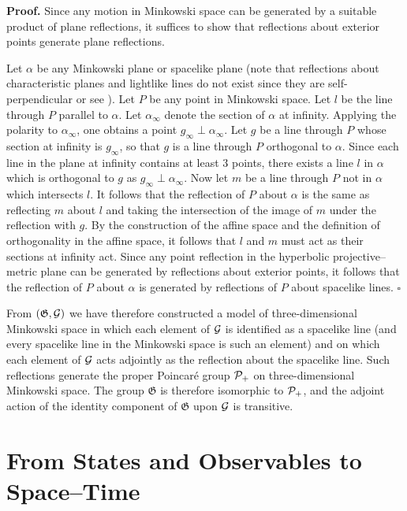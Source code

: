 \documentclass[a4paper,twoside,12pt]{article}
\newenvironment{proof}{\medskip \noindent 
            {\bf Proof.}}{ \hfill $\square$ \medskip}
\def\Gs{{\cal G}}
\def\Ps{{\cal P}}
\begin{document}
\begin{proof} Since any motion in Minkowski space can be generated by a
suitable product of plane reflections, it suffices to show that reflections
about exterior points generate plane reflections.

     Let $\alpha$ be any Minkowski plane or spacelike plane (note that
reflections about characteristic planes and lightlike lines do not exist
since they are self-perpendicular or see \cite{BK}). Let $P$ be any point in
Minkowski space. Let $l$ be the line through $P$ parallel to $\alpha$.
Let $\alpha_{\infty }$ denote the section of $\alpha$ at infinity.
Applying the polarity to $\alpha_{\infty }$, one obtains a point 
$g_{\infty} \perp \alpha_{\infty }$. Let $g$ be a line through $P$ whose 
section at infinity is $g_{\infty}$, so that $g$ is a line through $P$
orthogonal to $\alpha$. Since each line in the plane at infinity contains
at least 3 points, there exists a line $l$ in $\alpha$ which is
orthogonal to $g$ as $g_{\infty} \perp \alpha_{\infty}$. Now let 
$m$ be a line through $P$ not in $\alpha$ which intersects $l$. It
follows that the reflection of $P$ about $\alpha$ is the same as
reflecting $m$ about $l$ and taking the intersection of the image of $m$
under the reflection with $g$. By the construction of the affine space and
the definition of orthogonality in the affine space, it follows that $l$ and 
$m$ must act as their sections at infinity act. Since any point reflection
in the hyperbolic projective--metric plane can be generated by reflections
about exterior points, it follows that the reflection of $P$ about $\alpha$
is generated by reflections of $P$ about spacelike lines.
\end{proof}

     From $(\mathfrak{G},\Gs)$ we have therefore constructed a model
of three-dimensional Minkowski space in which each element of $\Gs$ is
identified as a spacelike line (and every spacelike line in the
Minkowski space is such an element) and on which each element of $\Gs$
acts adjointly as the reflection about the spacelike line. Such
reflections generate the proper Poincar\'e group $\Ps_+$ on
three-dimensional Minkowski space. The group $\mathfrak{G}$ is
therefore isomorphic to $\Ps_+$, and the adjoint action of the identity
component of $\mathfrak{G}$ upon $\Gs$ is transitive.

\section{From States and Observables to Space--Time}
\end{document}
